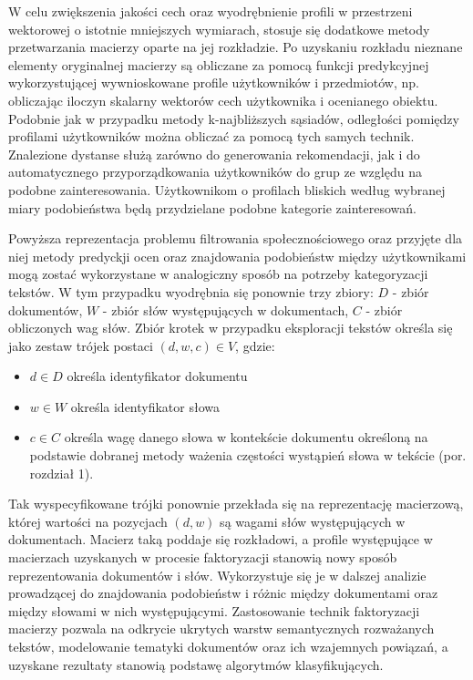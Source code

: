 \documentclass{pracamgr}
\begin{document}
W celu zwiększenia jakości cech oraz wyodrębnienie profili w przestrzeni wektorowej o istotnie mniejszych wymiarach, stosuje się dodatkowe metody przetwarzania macierzy oparte na jej rozkładzie. Po uzyskaniu rozkładu nieznane elementy oryginalnej macierzy są obliczane za pomocą funkcji predykcyjnej wykorzystującej wywnioskowane profile użytkowników i przedmiotów, np. obliczając iloczyn skalarny wektorów cech użytkownika i ocenianego obiektu. Podobnie jak w przypadku metody k-najbliższych sąsiadów, odległości pomiędzy profilami użytkowników można obliczać za pomocą tych samych technik. Znalezione dystanse służą zarówno do generowania rekomendacji, jak i do automatycznego przyporządkowania użytkowników do grup ze względu na podobne zainteresowania. Użytkownikom o profilach bliskich według wybranej miary podobieństwa będą przydzielane podobne kategorie zainteresowań.

Powyższa reprezentacja problemu filtrowania społecznościowego oraz przyjęte dla niej metody predyckji ocen oraz znajdowania podobieństw między użytkownikami mogą zostać wykorzystane w analogiczny sposób na potrzeby kategoryzacji tekstów. W tym przypadku wyodrębnia się ponownie trzy zbiory: $D$ - zbiór dokumentów, $W$ - zbiór słów występujących w dokumentach, $C$ - zbiór obliczonych wag słów. Zbiór krotek w przypadku eksploracji tekstów określa się jako zestaw trójek postaci $(d, w, c) \in V$, gdzie:
\begin{itemize} %
    \item $d \in D$ określa identyfikator dokumentu
    \item $w \in W$ określa identyfikator słowa
    \item $c \in C$ określa wagę danego słowa w kontekście dokumentu określoną na podstawie dobranej metody ważenia częstości wystąpień słowa w tekście (por. rozdział 1).
\end{itemize}

Tak wyspecyfikowane trójki ponownie przekłada się na reprezentację macierzową, której wartości na pozycjach $(d, w)$ są wagami słów występujących w dokumentach. Macierz taką poddaje się rozkładowi, a profile występujące w macierzach uzyskanych w procesie faktoryzacji stanowią nowy sposób reprezentowania dokumentów i słów. Wykorzystuje się je w dalszej analizie prowadzącej do znajdowania podobieństw i różnic między dokumentami oraz między słowami w nich występującymi. Zastosowanie technik faktoryzacji macierzy pozwala na odkrycie ukrytych warstw semantycznych rozważanych tekstów, modelowanie tematyki dokumentów oraz ich wzajemnych powiązań, a uzyskane rezultaty stanowią podstawę algorytmów klasyfikujących.
\end{document}
